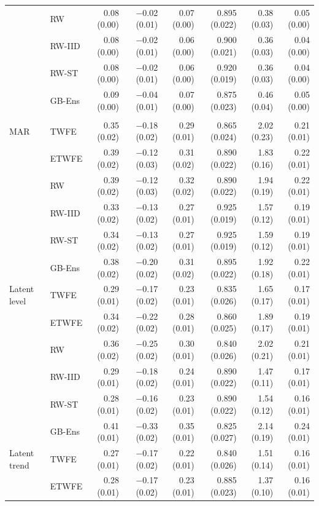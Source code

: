 \begin{table}
\begin{tabular*}{1\linewidth}{@{\extracolsep{\fill}}llrrrrrr}
 & RW & 0.08 (0.00) & −0.02 (0.01) & 0.07 (0.00) & 0.895 (0.022) & 0.38 (0.03) & 0.05 (0.00) \\ 
 & RW-IID & 0.08 (0.00) & −0.02 (0.01) & 0.06 (0.00) & 0.900 (0.021) & 0.36 (0.03) & 0.04 (0.00) \\ 
 & RW-ST & 0.08 (0.00) & −0.02 (0.01) & 0.06 (0.00) & 0.920 (0.019) & 0.36 (0.03) & 0.04 (0.00) \\ 
 & GB-Ens & 0.09 (0.00) & −0.04 (0.01) & 0.07 (0.00) & 0.875 (0.023) & 0.46 (0.04) & 0.05 (0.00) \\ 
\midrule\addlinespace[2.5pt]
\multicolumn{8}{l}{Without covariates, event year 4} \\[2.5pt] 
\midrule\addlinespace[2.5pt]
MAR & TWFE & 0.35 (0.02) & −0.18 (0.02) & 0.29 (0.01) & 0.865 (0.024) & 2.02 (0.23) & 0.21 (0.01) \\ 
 & ETWFE & 0.39 (0.02) & −0.12 (0.03) & 0.31 (0.02) & 0.890 (0.022) & 1.83 (0.16) & 0.22 (0.01) \\ 
 & RW & 0.39 (0.02) & −0.12 (0.03) & 0.32 (0.02) & 0.890 (0.022) & 1.94 (0.19) & 0.22 (0.01) \\ 
 & RW-IID & 0.33 (0.02) & −0.13 (0.02) & 0.27 (0.01) & 0.925 (0.019) & 1.57 (0.12) & 0.19 (0.01) \\ 
 & RW-ST & 0.34 (0.02) & −0.13 (0.02) & 0.27 (0.01) & 0.925 (0.019) & 1.59 (0.12) & 0.19 (0.01) \\ 
 & GB-Ens & 0.38 (0.02) & −0.20 (0.02) & 0.31 (0.02) & 0.895 (0.022) & 1.92 (0.18) & 0.22 (0.01) \\ 
Latent level & TWFE & 0.29 (0.01) & −0.17 (0.02) & 0.23 (0.01) & 0.835 (0.026) & 1.65 (0.17) & 0.17 (0.01) \\ 
 & ETWFE & 0.34 (0.02) & −0.22 (0.02) & 0.28 (0.01) & 0.860 (0.025) & 1.89 (0.17) & 0.19 (0.01) \\ 
 & RW & 0.36 (0.02) & −0.25 (0.02) & 0.30 (0.01) & 0.840 (0.026) & 2.02 (0.21) & 0.21 (0.01) \\ 
 & RW-IID & 0.29 (0.01) & −0.18 (0.02) & 0.24 (0.01) & 0.890 (0.022) & 1.47 (0.11) & 0.17 (0.01) \\ 
 & RW-ST & 0.28 (0.01) & −0.16 (0.02) & 0.23 (0.01) & 0.890 (0.022) & 1.54 (0.12) & 0.16 (0.01) \\ 
 & GB-Ens & 0.41 (0.01) & −0.33 (0.02) & 0.35 (0.01) & 0.825 (0.027) & 2.14 (0.19) & 0.24 (0.01) \\ 
Latent trend & TWFE & 0.27 (0.01) & −0.17 (0.02) & 0.22 (0.01) & 0.840 (0.026) & 1.51 (0.14) & 0.16 (0.01) \\ 
 & ETWFE & 0.28 (0.01) & −0.17 (0.02) & 0.23 (0.01) & 0.885 (0.023) & 1.37 (0.10) & 0.16 (0.01) \\ 

\end{tabular*}
\end{table}
